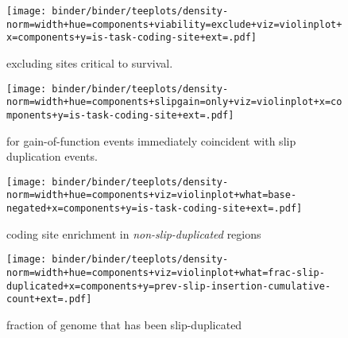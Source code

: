 \begin{figure*}

\begin{subfigure}{0.5\textwidth}
\texttt{[image: binder/binder/teeplots/density-norm=width+hue=components+viability=exclude+viz=violinplot+x=components+y=is-task-coding-site+ext=.pdf]}
\caption{%
\footnotesize
excluding sites critical to survival.
}
\end{subfigure}%
\begin{subfigure}{0.5\textwidth}
\texttt{[image: binder/binder/teeplots/density-norm=width+hue=components+slipgain=only+viz=violinplot+x=components+y=is-task-coding-site+ext=.pdf]}
\caption{%
\footnotesize
for gain-of-function events immediately coincident with slip duplication events.
}
\end{subfigure}

\begin{subfigure}{0.5\textwidth}
\texttt{[image: binder/binder/teeplots/density-norm=width+hue=components+viz=violinplot+what=base-negated+x=components+y=is-task-coding-site+ext=.pdf]}
\caption{%
\footnotesize
coding site enrichment in \textit{non-slip-duplicated} regions
}
\end{subfigure}%
\begin{subfigure}{0.5\textwidth}
\texttt{[image: binder/binder/teeplots/density-norm=width+hue=components+viz=violinplot+what=frac-slip-duplicated+x=components+y=prev-slip-insertion-cumulative-count+ext=.pdf]}
\caption{%
\footnotesize
fraction of genome that has been slip-duplicated
}
\label{fig:potentiation-supp:frac-slip-dup}
\end{subfigure}


\caption{%
\textbf{Supplemental figures for slip-duplication potentiation analysis.}
Distributions compare median enrichment of coding sites for novel tasks in slip-duplicated regions, normalized to neutral expectation.
  Values greater than 1 indicate that coding sites of novel traits occur more often in slip-duplicated regions compared to their background frequency.
  Significance of deviation from null expectation median value of 1.0 is indicated with * ($p < 0.05$), ** ($p < 0.01$), or *** ($p < 0.001$) (one-tailed Wilcoxon signed-rank test).
  Note that panel \ref{fig:potentiation-supp:frac-slip-dup} differs from other panels in showing fraction of genome sites that have been slip duplicated rather than coding site enrichment.
}
\label{fig:potentiation-supp}
\end{figure*}




